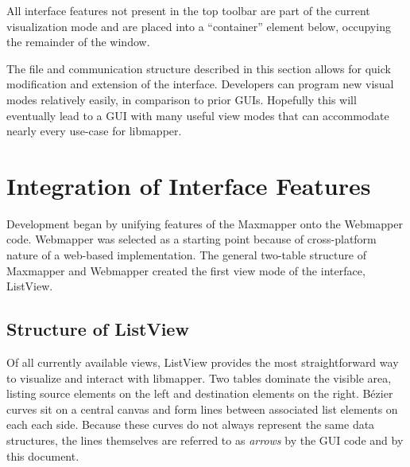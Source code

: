All interface features not present in the top toolbar are part of the current visualization mode and are placed into a ``container'' element below, occupying the remainder of the window.


The file and communication structure described in this section allows for quick modification and extension of the interface. Developers can program new visual modes relatively easily, in comparison to prior GUIs. Hopefully this will eventually lead to a GUI with many useful view modes that can accommodate nearly every use-case for libmapper.


\section{Integration of Interface Features} %
\label{sec:integration_of_interface_features}

Development began by unifying features of the Maxmapper onto the Webmapper code. Webmapper was selected as a starting point because of cross-platform nature of a web-based implementation. The general two-table structure of Maxmapper and Webmapper created the first view mode of the interface, ListView.

	\subsection{Structure of ListView} %
	\label{sub:ListView}

Of all currently available views, ListView provides the most straightforward way to visualize and interact with libmapper. Two tables dominate the visible area, listing source elements on the left and destination elements on the right. B\'ezier curves sit on a central canvas and form lines between associated list elements on each each side. Because these curves do not always represent the same data structures, the lines themselves are referred to as \emph{arrows} by the GUI code and by this document.


